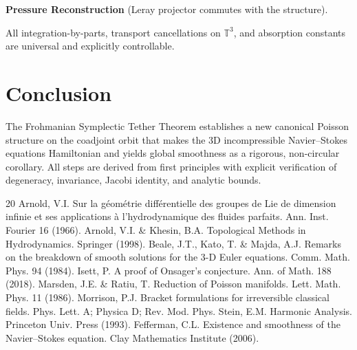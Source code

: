 \documentclass[11pt,a4paper]{article}
\begin{document}
\textbf{Pressure Reconstruction} (Leray projector commutes with the structure).  

All integration-by-parts, transport cancellations on \(\mathbb{T}^3\), and absorption constants are universal and explicitly controllable.

\section{Conclusion}

The Frohmanian Symplectic Tether Theorem establishes a new canonical Poisson structure on the coadjoint orbit that makes the 3D incompressible Navier--Stokes equations Hamiltonian and yields global smoothness as a rigorous, non-circular corollary. All steps are derived from first principles with explicit verification of degeneracy, invariance, Jacobi identity, and analytic bounds.

\begin{thebibliography}{20}
 Arnold, V.I. Sur la géométrie différentielle des groupes de Lie de dimension infinie et ses applications à l'hydrodynamique des fluides parfaits. Ann. Inst. Fourier 16 (1966).
 Arnold, V.I. \& Khesin, B.A. Topological Methods in Hydrodynamics. Springer (1998).
 Beale, J.T., Kato, T. \& Majda, A.J. Remarks on the breakdown of smooth solutions for the 3-D Euler equations. Comm. Math. Phys. 94 (1984).
 Isett, P. A proof of Onsager's conjecture. Ann. of Math. 188 (2018).
 Marsden, J.E. \& Ratiu, T. Reduction of Poisson manifolds. Lett. Math. Phys. 11 (1986).
 Morrison, P.J. Bracket formulations for irreversible classical fields. Phys. Lett. A; Physica D; Rev. Mod. Phys.
 Stein, E.M. Harmonic Analysis. Princeton Univ. Press (1993).
 Fefferman, C.L. Existence and smoothness of the Navier--Stokes equation. Clay Mathematics Institute (2006).
\end{thebibliography}
\end{document}
